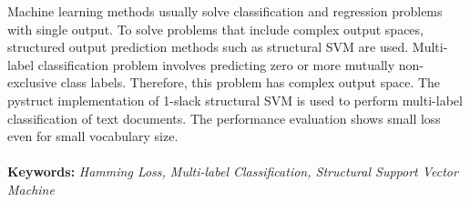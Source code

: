 Machine learning methods usually solve classification and regression problems with single output. To solve problems that include complex output spaces, structured output prediction methods such as structural SVM are used. Multi-label classification problem involves predicting zero or more mutually non-exclusive class labels. Therefore, this problem has complex output space. The pystruct implementation of 1-slack structural SVM is used to perform multi-label classification of text documents. The performance evaluation shows small loss even for small vocabulary size.
\\\\
\textbf{Keywords:} \textit{Hamming Loss, Multi-label Classification, Structural Support Vector Machine}